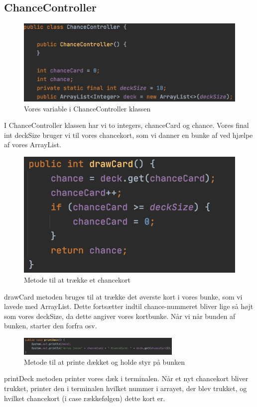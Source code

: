 \subsection{ChanceController}
\begin{figure}[H]
    \centering
    \includegraphics{sources/7_implementering/ControllerClass.png}
    \caption{Vores variable i ChanceController klassen}
    \label{fig:ChanceController}
\end{figure}
I ChanceController klassen har vi to integers, chanceCard og chance. Vores final int deckSize bruger vi til vores chancekort, som vi danner en bunke af ved hjælpe af vores ArrayList.




\begin{figure}[H]
    \centering
    \includegraphics{sources/7_implementering/ControllerDraw.png}
    \caption{Metode til at trække et chancekort}
    \label{fig:draw}
\end{figure}
drawCard metoden bruges til at trække det øverste kort i vores bunke, som vi lavede med ArrayList. Dette fortsætter indtil chance-nummeret bliver lige så højt som vores deckSize, da dette angiver vores kortbunke. Når vi når bunden af bunken, starter den forfra osv.





\begin{figure}[H]
    \centering
    \includegraphics[width=0.7\textwidth]{sources/7_implementering/ControllerprintDeck.png}
    \caption{Metode til at printe dækket og holde styr på bunken}
    \label{fig:print}
\end{figure}
printDeck metoden printer vores dæk i terminalen. Når et nyt chancekort bliver trukket, printer den i terminalen hvilket nummer i arrayet, der blev trukket, og hvilket chancekort (i case rækkefølgen) dette kort er.




